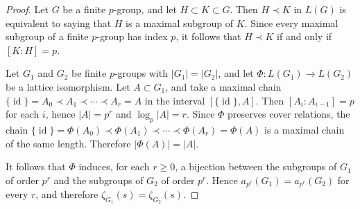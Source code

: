 \documentclass[10pt,a4paper]{amsart}
\DeclareMathOperator{\id}{\mathrm{id}}
\begin{document}
\begin{proof}
Let $G$ be a finite $p$-group, and let $H\subset K\subset G$.
Then $H\prec K$ in $L(G)$ is equivalent to saying that $H$ is a maximal subgroup of $K$.
Since every maximal subgroup of a finite $p$-group has index $p$, it follows that
$H\prec K$ if and only if $[K:H]=p$.

Let $G_{1}$ and $G_{2}$ be finite $p$-groups with $|G_{1}|=|G_{2}|$,
and let $\Phi\colon L(G_{1})\to L(G_{2})$ be a lattice isomorphism.
Let $A\subset G_{1}$, and take a maximal chain $\{\id\}=A_{0}\prec A_{1}\prec \dotsb \prec A_{r}=A$
in the interval $[\{\id\},A]$.
Then $[A_{i}:A_{i-1}]=p$ for each $i$, hence $|A|=p^{r}$ and $\log_{p}|A|=r$.
Since $\Phi$ preserves cover relations, the chain
$\{\id\}=\Phi(A_{0})\prec \Phi(A_{1})\prec \dotsb \prec \Phi(A_{r})=\Phi(A)$
is a maximal chain of the same length.
Therefore $|\Phi(A)|=|A|$.

It follows that $\Phi$ induces, for each $r\ge 0$, a bijection between the subgroups of $G_{1}$
of order $p^{r}$ and the subgroups of $G_{2}$ of order $p^{r}$.
Hence $a_{p^{r}}(G_{1})=a_{p^{r}}(G_{2})$ for every $r$, and therefore
$\zeta_{G_{1}}(s)=\zeta_{G_{2}}(s)$.
\end{proof}
\end{document}
